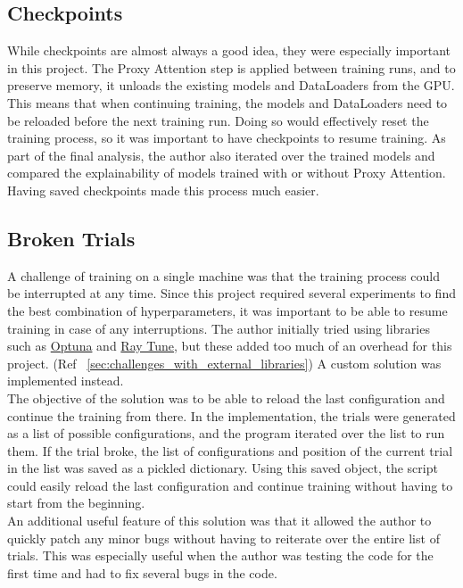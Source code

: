 \subsection{Checkpoints} \label{sec:checkpoints}
While checkpoints are almost always a good idea, they were especially important in this project. The Proxy Attention step is applied between training runs, and to preserve memory, it unloads the existing models and DataLoaders from the GPU. This means that when continuing training, the models and DataLoaders need to be reloaded before the next training run. Doing so would effectively reset the training process, so it was important to have checkpoints to resume training.
As part of the final analysis, the author also iterated over the trained models and compared the explainability of models trained with or without Proxy Attention. Having saved checkpoints made this process much easier.

\subsection{Broken Trials}
A challenge of training on a single machine was that the training process could be interrupted at any time. Since this project required several experiments to find the best combination of hyperparameters, it was important to be able to resume training in case of any interruptions. The author initially tried using libraries such as \href{https://github.com/optuna/optuna}{Optuna} and \href{https://github.com/ray-project/ray}{Ray Tune}, but these added too much of an overhead for this project. (Ref ~\ref{sec:challenges_with_external_libraries}) A custom solution was implemented instead.\\
The objective of the solution was to be able to reload the last configuration and continue the training from there. In the implementation, the trials were generated as a list of possible configurations, and the program iterated over the list to run them. If the trial broke, the list of configurations and position of the current trial in the list was saved as a pickled dictionary. Using this saved object, the script could easily reload the last configuration and continue training without having to start from the beginning.\\
An additional useful feature of this solution was that it allowed the author to quickly patch any minor bugs without having to reiterate over the entire list of trials. This was especially useful when the author was testing the code for the first time and had to fix several bugs in the code.


